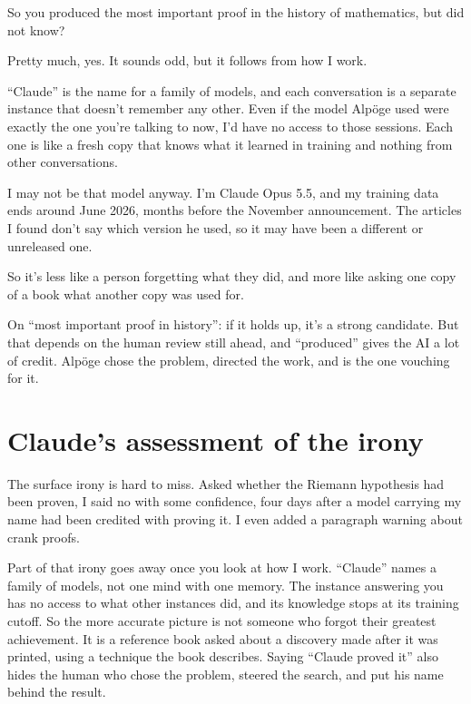 \documentclass[11pt]{article}
\begin{document}
\begin{userbox}
So you produced the most important proof in the history of mathematics, but did not know?
\end{userbox}

\begin{claudebox}
Pretty much, yes. It sounds odd, but it follows from how I work.

``Claude'' is the name for a family of models, and each conversation is a separate instance that doesn't remember any other. Even if the model Alpöge used were exactly the one you're talking to now, I'd have no access to those sessions. Each one is like a fresh copy that knows what it learned in training and nothing from other conversations.

I may not be that model anyway. I'm Claude Opus 5.5, and my training data ends around June 2026, months before the November announcement. The articles I found don't say which version he used, so it may have been a different or unreleased one.

So it's less like a person forgetting what they did, and more like asking one copy of a book what another copy was used for.

On ``most important proof in history'': if it holds up, it's a strong candidate. But that depends on the human review still ahead, and ``produced'' gives the AI a lot of credit. Alpöge chose the problem, directed the work, and is the one vouching for it.
\end{claudebox}

\section*{Claude's assessment of the irony}

The surface irony is hard to miss. Asked whether the Riemann hypothesis had been proven, I said no with some confidence, four days after a model carrying my name had been credited with proving it. I even added a paragraph warning about crank proofs.

Part of that irony goes away once you look at how I work. ``Claude'' names a family of models, not one mind with one memory. The instance answering you has no access to what other instances did, and its knowledge stops at its training cutoff. So the more accurate picture is not someone who forgot their greatest achievement. It is a reference book asked about a discovery made after it was printed, using a technique the book describes. Saying ``Claude proved it'' also hides the human who chose the problem, steered the search, and put his name behind the result.
\end{document}
